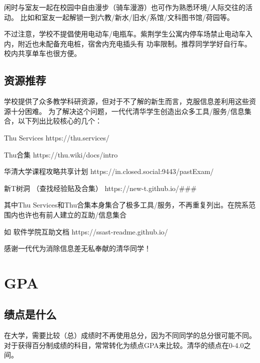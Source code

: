 \documentclass{article}
\begin{document}
闲时与室友一起在校园中自由漫步（骑车漫游）也可作为熟悉环境/人际交往的活动。
比如和室友一起解锁一到六教/新水/旧水/系馆/文科图书馆/荷园等。

不过注意，学校不提倡使用电动车/电瓶车。紫荆学生公寓内停车场禁止电动车入内，附近也未配备充电桩，宿舍内充电插头有
功率限制。推荐同学学好自行车。校内共享单车也很方便。

\subsection{资源推荐}
学校提供了众多教学科研资源，但对于不了解的新生而言，克服信息差利用这些资源十分困难。
为了解决这个问题，一代代清华学生创造出众多工具/服务/信息集合，以下列出比较核心的几个：

Thu Services
https://thu.services/

Thu合集
https://thu.wiki/docs/intro

华清大学课程攻略共享计划
https://in.closed.social:9443/pastExam/

新T树洞 （查找经验贴及合集）
https://new-t.github.io/\textnormal{\#}\textnormal{\#}\textnormal{\#}


其中Thu Services和Thu合集本身集合了极多工具/服务，不再重复列出。在院系范围内也许也有前人建立的互助/信息集合


如 软件学院互助文档
https://ssast-readme.github.io/


感谢一代代为消除信息差无私奉献的清华同学！


\section{GPA}
\subsection{绩点是什么}
在大学，需要比较（总）成绩时不再使用总分，因为不同同学的总分很可能不同。
对于获得百分制成绩的科目，常常转化为绩点GPA来比较。清华的绩点在0-4.0之间。
\end{document}
